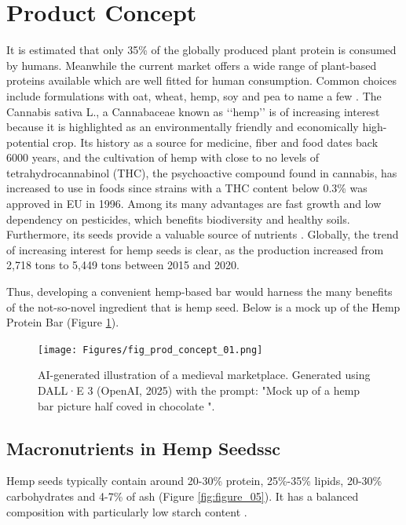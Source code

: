 \section{Product Concept}
It is estimated that only 35\% of the globally produced plant protein is consumed by humans. Meanwhile the current market offers a wide range of plant-based proteins available which are well fitted for human consumption. Common choices include formulations with oat, wheat, hemp, soy and pea to name a few \cite*{Gorissen2018PlantProteinIsolates}. The Cannabis sativa L., a Cannabaceae known as ‘‘hemp’’ is of increasing interest because it is highlighted as an environmentally friendly and economically high-potential crop. Its history as a source for medicine, fiber and food dates back 6000 years, and the cultivation of hemp with close to no levels of tetrahydrocannabinol (THC), the psychoactive compound found in cannabis, has increased to use in foods since strains with a THC content below 0.3\% was approved in EU in 1996. Among its many advantages are fast growth and low dependency on pesticides, which benefits biodiversity and healthy soils. Furthermore, its seeds provide a valuable source of nutrients \cite*{HempBook}. Globally, the trend of increasing interest for hemp seeds is clear, as the production increased from 2,718 tons to 5,449 tons between 2015 and 2020. 

\vspace{1em}
Thus, developing a convenient hemp-based bar would harness the many benefits of the not-so-novel ingredient that is hemp seed. Below is a mock up of the Hemp Protein Bar (Figure \ref*{fig:figure_04}).

\begin{figure}[H]
    \centering
    \texttt{[image: Figures/fig\_prod\_concept\_01.png]}
    \caption{AI-generated illustration of a medieval marketplace. Generated using DALL·E 3 (OpenAI, 2025) with the prompt: "Mock up of a hemp bar picture half coved in chocolate ".}
    \label{fig:figure_04}
\end{figure}


\subsection{Macronutrients in Hemp Seedssc}
Hemp seeds typically contain around 20-30\% protein, 25\%-35\% lipids, 20-30\% carbohydrates and 4-7\% of ash (Figure \ref*{fig:figure_05}). It has a balanced composition with particularly low starch content \cite*{montero2023hemp}.

